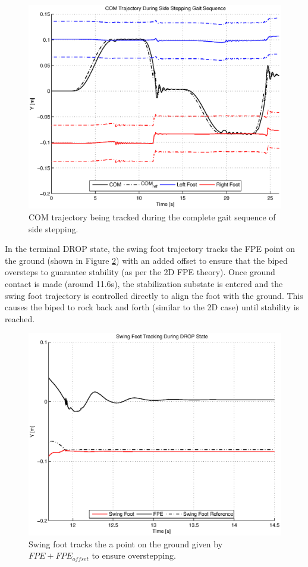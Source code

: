 \begin{figure}[!h]
	\centering
    \includegraphics[scale=0.8]{fig/simulations/comtraj.eps}
  	\caption{COM trajectory being tracked during the complete gait sequence of side stepping.}
	\label{fig:comtraj}
\end{figure}


In the terminal DROP state, the swing foot trajectory tracks the FPE point on the ground (shown in Figure \ref{fig:fpetrack}) with an added offset to ensure that the biped oversteps to guarantee stability (as per the 2D FPE theory). Once ground contact is made (around 11.6s), the stabilization substate is entered and the swing foot trajectory is controlled directly to align the foot with the ground. This causes the biped to rock back and forth (similar to the 2D case) until stability is reached.

\begin{figure}[!h]
	\centering
    \includegraphics[scale=0.8]{fig/simulations/fpetrack.eps}
  	\caption{Swing foot tracks the a point on the ground given by $FPE + FPE_{offset}$ to ensure overstepping.}
	\label{fig:fpetrack}
\end{figure}


